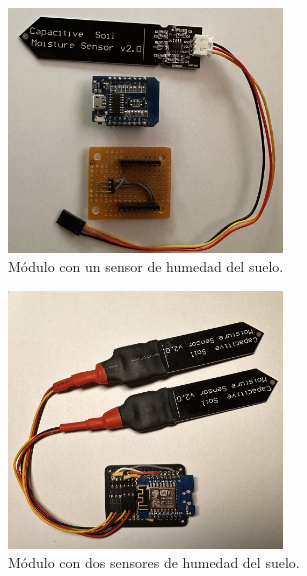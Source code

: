 \begin{figure}[!h]
     \centering
     \begin{subfigure}[b]{0.45\textwidth}
		\centering
		\includegraphics[width=0.80\textwidth]{./Figures/soil1.jpeg}
		\caption[Módulo con un sensor de humedad del suelo]{Módulo con un sensor de humedad del suelo.}
		\label{fig:soil1}
     \end{subfigure}
     \hfill
     \begin{subfigure}[b]{0.45\textwidth}
	\centering
		\includegraphics[width=0.80\textwidth]{./Figures/soil2.jpeg}
		\caption[Módulo con dos sensores de humedad del suelo]{Módulo con dos sensores de humedad del suelo.}
		\label{fig:soil2}
     \end{subfigure}
      \begin{subfigure}[b]{0.45\textwidth}

\end{subfigure}
\end{figure}
